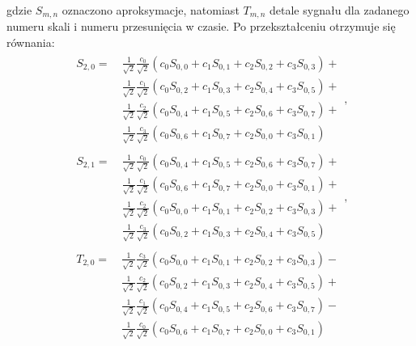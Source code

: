 gdzie $S_{m,n}$ oznaczono aproksymacje, natomiast $T_{m,n}$ detale sygnału dla zadanego numeru skali i numeru przesunięcia w czasie. Po przekształceniu otrzymuje się równania:
\begin{gather}
\begin{split}
S_{2,0} = ~
	& \frac{1}{\sqrt{2}} \frac{c_{0}}{\sqrt{2}} \left( c_{0} S_{0,0} + c_{1} S_{0,1} + c_{2} S_{0,2} + c_{3} S_{0,3} \right) + \\
	& \frac{1}{\sqrt{2}} \frac{c_{1}}{\sqrt{2}} \left( c_{0} S_{0,2} + c_{1} S_{0,3} + c_{2} S_{0,4} + c_{3} S_{0,5} \right) + \\
	& \frac{1}{\sqrt{2}} \frac{c_{2}}{\sqrt{2}} \left( c_{0} S_{0,4} + c_{1} S_{0,5} + c_{2} S_{0,6} + c_{3} S_{0,7} \right) + \\
	& \frac{1}{\sqrt{2}} \frac{c_{3}}{\sqrt{2}} \left( c_{0} S_{0,6} + c_{1} S_{0,7} + c_{2} S_{0,0} + c_{3} S_{0,1} \right)
\end{split}
\label{eqn_db2_outvect_s_2_0_rek}, \\
\begin{split}
S_{2,1} = ~
	& \frac{1}{\sqrt{2}} \frac{c_{0}}{\sqrt{2}} \left( c_{0} S_{0,4} + c_{1} S_{0,5} + c_{2} S_{0,6} + c_{3} S_{0,7} \right) + \\
	& \frac{1}{\sqrt{2}} \frac{c_{1}}{\sqrt{2}} \left( c_{0} S_{0,6} + c_{1} S_{0,7} + c_{2} S_{0,0} + c_{3} S_{0,1} \right) + \\
	& \frac{1}{\sqrt{2}} \frac{c_{2}}{\sqrt{2}} \left( c_{0} S_{0,0} + c_{1} S_{0,1} + c_{2} S_{0,2} + c_{3} S_{0,3} \right) + \\
	& \frac{1}{\sqrt{2}} \frac{c_{3}}{\sqrt{2}} \left( c_{0} S_{0,2} + c_{1} S_{0,3} + c_{2} S_{0,4} + c_{3} S_{0,5} \right)
\end{split}
\label{eqn_db2_outvect_s_2_1_rek}, \\
\begin{split}
T_{2,0} = ~
	& \frac{1}{\sqrt{2}} \frac{c_{3}}{\sqrt{2}} \left( c_{0} S_{0,0} + c_{1} S_{0,1} + c_{2} S_{0,2} + c_{3} S_{0,3} \right) - \\
	& \frac{1}{\sqrt{2}} \frac{c_{2}}{\sqrt{2}} \left( c_{0} S_{0,2} + c_{1} S_{0,3} + c_{2} S_{0,4} + c_{3} S_{0,5} \right) + \\
	& \frac{1}{\sqrt{2}} \frac{c_{1}}{\sqrt{2}} \left( c_{0} S_{0,4} + c_{1} S_{0,5} + c_{2} S_{0,6} + c_{3} S_{0,7} \right) - \\
	& \frac{1}{\sqrt{2}} \frac{c_{0}}{\sqrt{2}} \left( c_{0} S_{0,6} + c_{1} S_{0,7} + c_{2} S_{0,0} + c_{3} S_{0,1} \right)
\end{split}

\end{gather}
